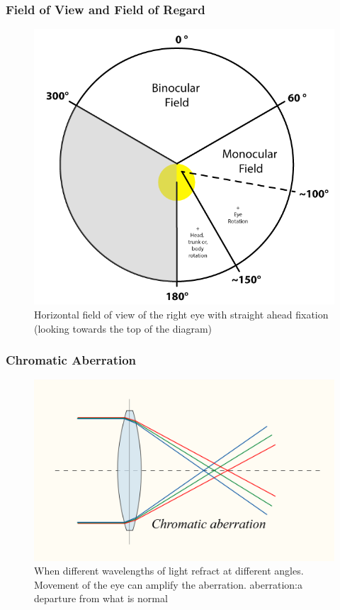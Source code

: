 \begin{frame}
	\frametitle{Field of View and Field of Regard}
	\begin{figure}
		\includegraphics[scale=.3]{assets/fov} 
		\caption{Horizontal field of view of the right eye with straight ahead fixation (looking towards the top of the diagram)}
	\end{figure}
\end{frame}


\begin{frame}
	\frametitle{Chromatic Aberration }
	
	\begin{figure}
		\includegraphics[scale=.1]{assets/aberration} 
		\caption{When different wavelengths of light refract at different angles. Movement of the eye can amplify the aberration. \tiny{aberration:a departure from what is normal}}
	\end{figure}
\end{frame}

